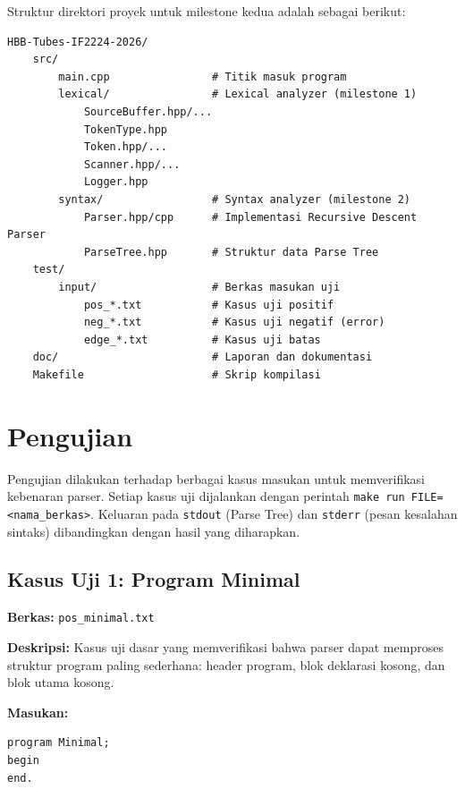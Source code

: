 \documentclass[12pt,a4paper]{article}
\begin{document}
Struktur direktori proyek untuk milestone kedua adalah sebagai berikut:

\begin{lstlisting}[style=bash, caption={Tata letak direktori proyek}]
HBB-Tubes-IF2224-2026/
    src/
        main.cpp                # Titik masuk program
        lexical/                # Lexical analyzer (milestone 1)
            SourceBuffer.hpp/...
            TokenType.hpp
            Token.hpp/...
            Scanner.hpp/...
            Logger.hpp
        syntax/                 # Syntax analyzer (milestone 2)
            Parser.hpp/cpp      # Implementasi Recursive Descent Parser
            ParseTree.hpp       # Struktur data Parse Tree
    test/
        input/                  # Berkas masukan uji
            pos_*.txt           # Kasus uji positif
            neg_*.txt           # Kasus uji negatif (error)
            edge_*.txt          # Kasus uji batas
    doc/                        # Laporan dan dokumentasi
    Makefile                    # Skrip kompilasi
\end{lstlisting}


\section{Pengujian}

Pengujian dilakukan terhadap berbagai kasus masukan untuk memverifikasi kebenaran parser. Setiap kasus uji dijalankan dengan perintah \texttt{make run FILE=<nama\_berkas>}. Keluaran pada \texttt{stdout} (Parse Tree) dan \texttt{stderr} (pesan kesalahan sintaks) dibandingkan dengan hasil yang diharapkan.

\subsection{Kasus Uji 1: Program Minimal}
\textbf{Berkas:} \texttt{pos\_minimal.txt}

\textbf{Deskripsi:} Kasus uji dasar yang memverifikasi bahwa parser dapat memproses struktur program paling sederhana: header program, blok deklarasi kosong, dan blok utama kosong.

\textbf{Masukan:}
\begin{lstlisting}[style=default]
program Minimal;
begin
end.
\end{lstlisting}
\end{document}
